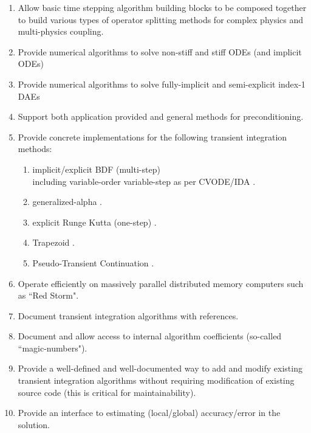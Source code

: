 \documentclass[pdf,ps2pdf,11pt]{SANDreport}
\begin{document}
\begin{enumerate}
{}\item Allow basic time stepping algorithm building blocks to be composed
together to build various types of operator splitting methods for complex
physics and multi-physics coupling.

{}\item Provide numerical algorithms to solve non-stiff and stiff ODEs (and
implicit ODEs)

{}\item Provide numerical algorithms to solve fully-implicit and semi-explicit
index-1 DAEs

{}\item Support both application provided and general methods for
preconditioning.

{}\item Provide concrete implementations for the following transient integration methods:
  \begin{enumerate}
  {}\item implicit/explicit BDF (multi-step) \\
        including variable-order variable-step as per CVODE/IDA \cite{CVODE,IDA}.
  {}\item generalized-alpha \cite{GeneralizedAlpha}.
  {}\item explicit Runge Kutta (one-step) \cite{ERKMethods}.
  {}\item Trapezoid \cite{Trapezoid}.
  {}\item Pseudo-Transient Continuation \cite{PTC,PTCDAE}.
  \end{enumerate}

{}\item Operate efficiently on massively parallel distributed memory
computers such as ``Red Storm".

{}\item Document transient integration algorithms with references.

{}\item Document and allow access to internal algorithm coefficients
(so-called ``magic-numbers").

{}\item Provide a well-defined and well-documented way to add and modify
existing transient integration algorithms without requiring modification of
existing source code (this is critical for maintainability).

{}\item Provide an interface to estimating (local/global)
accuracy/error in the solution.


\end{enumerate}
\end{document}
